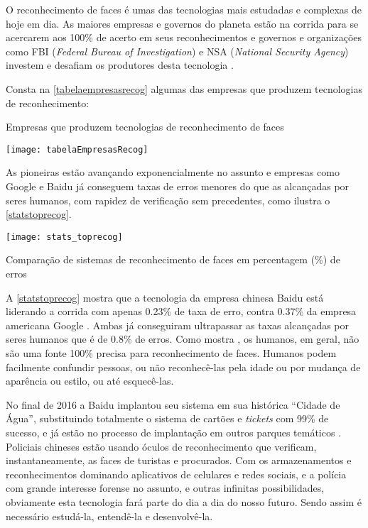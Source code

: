 O reconhecimento de faces é umas das tecnologias mais estudadas e complexas de hoje em dia. As maiores empresas e governos do planeta estão na corrida para se acercarem aos 100\% de acerto em seus reconhecimentos e governos e organizações como FBI (\textit{Federal Bureau of Investigation}) e NSA (\textit{National Security Agency})  investem e desafiam os produtores desta tecnologia \cite{nstc_homeland}.

Consta na \autoref{tabelaempresasrecog} algumas das empresas que produzem tecnologias de reconhecimento:


\begin{table}[h]
	\centering
	\caption{Empresas que produzem tecnologias de reconhecimento de faces}
	\texttt{[image: tabelaEmpresasRecog]}
	\label{tabelaempresasrecog}
\end{table}

As pioneiras estão avançando exponencialmente no assunto e empresas como Google e Baidu já conseguem taxas de erros menores do que as alcançadas por seres humanos, com rapidez de verificação sem precedentes, como ilustra o \autoref{statstoprecog}.

\begin{grafico}[h]
	\centering
	\texttt{[image: stats\_toprecog]}
	\caption{Comparação de sistemas de reconhecimento de faces em percentagem (\%) de erros}
	\label{statstoprecog}
\end{grafico}


A \autoref{statstoprecog} mostra que a tecnologia da empresa chinesa Baidu está liderando a corrida com apenas 0.23\% de taxa de erro, contra 0.37\% da empresa americana Google \cite{stats_economy_compass_2017}. Ambas já conseguiram ultrapassar as taxas alcançadas por seres humanos que é de 0.8\% de erros. Como mostra , os humanos, em geral, não são uma fonte 100\% precisa para reconhecimento de faces. Humanos podem facilmente confundir pessoas, ou não reconhecê-las pela idade ou por mudança de aparência ou estilo, ou até esquecê-las.

No final de 2016 a Baidu implantou seu sistema em sua histórica “Cidade de Água”, substituindo totalmente o sistema de cartões e \textit{tickets} com 99\% de sucesso, e já estão no processo de implantação em outros parques temáticos \cite{baidiu_theverge}. Policiais chineses estão usando óculos de reconhecimento que verificam, instantaneamente, as faces de turistas e procurados. Com os armazenamentos e reconhecimentos dominando aplicativos de celulares e redes sociais, e a polícia com grande interesse forense no assunto, e outras infinitas possibilidades, obviamente esta tecnologia fará parte do dia a dia do nosso futuro. Sendo assim é necessário estudá-la, entendê-la e desenvolvê-la.










